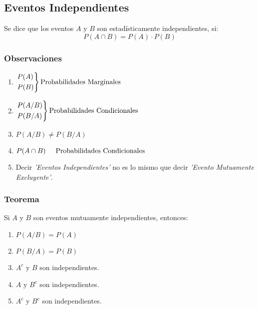 \subsection{Eventos Independientes}
Se dice que los eventos $A$ y $B$ son estadísticamente independientes, si:
$$P(A\cap B)=P(A)\cdot P(B)$$
\subsubsection{Observaciones}
\begin{enumerate}
\item $\begin{rcases}
  P(A)\\
  P(B)
\end{rcases} \text{Probabilidades Marginales}$
\item $\begin{rcases}
  P(A/B)\\
  P(B/A)
\end{rcases} \text{Probabilidades Condicionales}$
\item $P(A/B)\neq P(B/A)$
\item $P(A \cap B) \hspace{0.5cm} \text{Probabilidades Condicionales}$
\item Decir \textit{'Eventos Independientes'} no es lo mismo que decir \textit{'Evento Mutuamente Excluyente'}.
\end{enumerate}
\subsubsection{Teorema}
Si $A$ y $B$ son eventos mutuamente independientes, entonces:
\begin{enumerate}
\item $P(A/B)=P(A)$
\item $P(B/A)=P(B)$
\item $A^c$ y $B$ son independientes.
\item $A$ y $B^c$ son independientes.
\item $A^c$ y $B^c$ son independientes.
\end{enumerate}